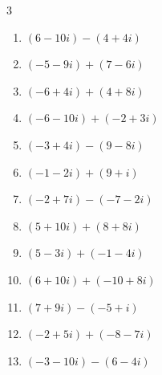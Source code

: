 \begin{multicols}{3}
\begin{enumerate}
  \item $\displaystyle (6-10i) - (4+4i)$

        \phantom{$\displaystyle =2-14i$}

  \item $\displaystyle (-5-9i) + (7-6i)$

        \phantom{$\displaystyle =2-15i$}

  \item $\displaystyle (-6+4i) + (4+8i)$

        \phantom{$\displaystyle =-2+12i$}

  \item $\displaystyle (-6-10i) + (-2+3i)$

        \phantom{$\displaystyle =-8-7i$}

\columnbreak %

  \item $\displaystyle (-3+4i) - (9-8i)$

        \phantom{$\displaystyle =-12+12i$}

  \item $\displaystyle (-1-2i) + (9+i)$

        \phantom{$\displaystyle =8-i$}

  \item $\displaystyle (-2+7i) - (-7-2i)$

        \phantom{$\displaystyle =5+9i$}

  \item $\displaystyle (5+10i) + (8+8i)$

        \phantom{$\displaystyle =13+18i$}

  \item $\displaystyle (5-3i) + (-1-4i)$

        \phantom{$\displaystyle =4-7i$}

  \item $\displaystyle (6+10i) + (-10+8i)$

        \phantom{$\displaystyle =-4+18i$}

  \item $\displaystyle (7+9i) - (-5+i)$

        \phantom{$\displaystyle =12+8i$}

  \item $\displaystyle (-2+5i) + (-8-7i)$

        \phantom{$\displaystyle =-10-2i$}

  \item $\displaystyle (-3-10i) - (6-4i)$


\end{enumerate}
\end{multicols}
